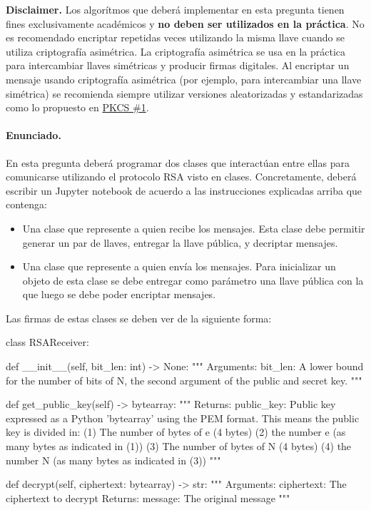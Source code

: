 \textbf{Disclaimer.} Los algorítmos que deberá implementar en esta pregunta tienen fines exclusivamente académicos y \textbf{no deben ser utilizados en la práctica}. No es recomendado encriptar repetidas veces utilizando la misma llave cuando se utiliza criptografía asimétrica. La criptografía asimétrica se usa en la práctica para intercambiar llaves simétricas y producir firmas digitales. Al encriptar un mensaje usando criptografía asimétrica (por ejemplo, para intercambiar una llave simétrica) se recomienda siempre utilizar versiones aleatorizadas y estandarizadas como lo propuesto en \href{https://en.wikipedia.org/wiki/PKCS_1}{PKCS \#1}.

\paragraph{Enunciado.} En esta pregunta deberá programar dos clases que interactúan entre ellas para comunicarse utilizando el protocolo RSA visto en clases. Concretamente, deberá escribir un Jupyter notebook de acuerdo a las instrucciones explicadas arriba que contenga:

\begin{itemize}
  \item Una clase que represente a quien recibe los mensajes. Esta clase debe permitir generar un par de llaves, entregar la llave pública, y decriptar mensajes.
  \item Una clase que represente a quien envía los mensajes. Para inicializar un objeto de esta clase se debe entregar como parámetro una llave pública con la que luego se debe poder encriptar mensajes.
\end{itemize}

Las firmas de estas clases se deben ver de la siguiente forma:

\begin{python}
  class RSAReceiver:
    
    def __init__(self, bit_len: int) -> None:
    """
    Arguments:
      bit_len: A lower bound for the number of bits of N,
               the second argument of the public and secret key.
    """

    def get_public_key(self) -> bytearray:
    """
    Returns:
      public_key: Public key expressed as a Python 'bytearray' using the
                  PEM format. This means the public key is divided in:
                  (1) The number of bytes of e (4 bytes)
                  (2) the number e (as many bytes as indicated in (1))
                  (3) The number of bytes of N (4 bytes)
                  (4) the number N (as many bytes as indicated in (3))
    """

    def decrypt(self, ciphertext: bytearray) -> str:
    """
    Arguments:
      ciphertext: The ciphertext to decrypt
    Returns:
      message: The original message
    """
\end{python}

